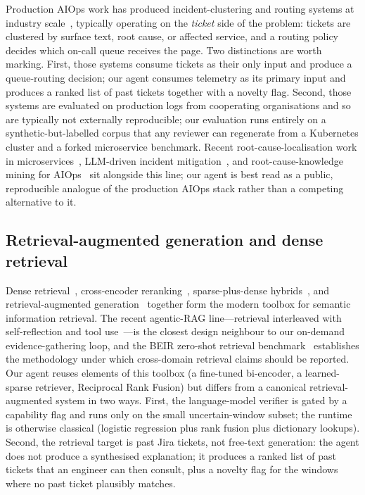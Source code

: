 Production AIOps work has produced incident-clustering and routing systems at industry scale~\cite{notaro2021aiops,incident-routing,incident-clustering,chen2019triage}, typically operating on the \emph{ticket} side of the problem: tickets are clustered by surface text, root cause, or affected service, and a routing policy decides which on-call queue receives the page. Two distinctions are worth marking. First, those systems consume tickets as their only input and produce a queue-routing decision; our agent consumes telemetry as its primary input and produces a ranked list of past tickets together with a novelty flag. Second, those systems are evaluated on production logs from cooperating organisations and so are typically not externally reproducible; our evaluation runs entirely on a synthetic-but-labelled corpus that any reviewer can regenerate from a Kubernetes cluster and a forked microservice benchmark. Recent root-cause-localisation work in microservices~\cite{microrca}, LLM-driven incident mitigation~\cite{ahmed2023llm}, and root-cause-knowledge mining for AIOps~\cite{saha2022rca} sit alongside this line; our agent is best read as a public, reproducible analogue of the production AIOps stack rather than a competing alternative to it.

\subsection{Retrieval-augmented generation and dense retrieval}
\label{sec:related:rag}

Dense retrieval~\cite{reimers2019sbert,karpukhin2020dpr,colbert}, cross-encoder reranking~\cite{ms-marco-reranker,monobert,nogueira2019rerank}, sparse-plus-dense hybrids~\cite{formal2021splade}, and retrieval-augmented generation~\cite{lewis2020rag,izacard2023atlas} together form the modern toolbox for semantic information retrieval. The recent agentic-RAG line---retrieval interleaved with self-reflection and tool use~\cite{selfrag,yao2023react}---is the closest design neighbour to our on-demand evidence-gathering loop, and the BEIR zero-shot retrieval benchmark~\cite{beir} establishes the methodology under which cross-domain retrieval claims should be reported. Our agent reuses elements of this toolbox (a fine-tuned bi-encoder, a learned-sparse retriever, Reciprocal Rank Fusion) but differs from a canonical retrieval-augmented system in two ways. First, the language-model verifier is gated by a capability flag and runs only on the small uncertain-window subset; the runtime is otherwise classical (logistic regression plus rank fusion plus dictionary lookups). Second, the retrieval target is past Jira tickets, not free-text generation: the agent does not produce a synthesised explanation; it produces a ranked list of past tickets that an engineer can then consult, plus a novelty flag for the windows where no past ticket plausibly matches.

